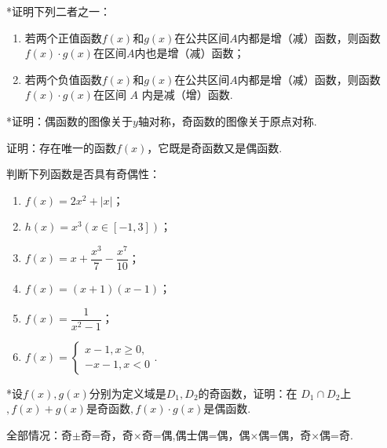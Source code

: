\documentclass[lang=cn,math=cm,chinesefont=nofont,11pt,scheme=chinese,twocol]{elegantbook}
\begin{document}
\begin{exercise}
  *证明下列二者之一：
\end{exercise}

\begin{enumerate}
  \item 若两个正值函数$f(x)$和$g(x)$在公共区间$A$内都是增（减）函数，则函数$f(x)\cdot g(x)$在区间$A$内也是增（减）函数；
  \item 若两个负值函数$f(x)$和$g(x)$在公共区间$A$内都是增（减）函数，则函数$f(x)\cdot g(x)$在区间 $A$ 内是减（增）函数.
\end{enumerate}

\begin{exercise}
  *证明：偶函数的图像关于$y$轴对称，奇函数的图像关于原点对称.
\end{exercise}

\begin{spacing}{1.8}
  \begin{exercise}
    证明：存在唯一的函数$f(x)$，它既是奇函数又是偶函数.
  \end{exercise}

  \begin{exercise}
    判断下列函数是否具有奇偶性：
  \end{exercise}

  \begin{enumerate}
    \item $f(x)=2x^2+|x|$；
    \item $h(x)=x^3(x\in[-1,3])$；
    \item $f(x)=x+\dfrac{x^3}7-\dfrac{x^7}{10}$；
    \item $f(x)=(x+1)(x-1)$；
    \item $f(x)=\dfrac{1}{x^{2}-1}$；
    \item $f(x)=\begin{cases}x-1, x\geqslant0,\\-x-1, x<0\end{cases}$.
  \end{enumerate}
\end{spacing}

\begin{exercise}
  *设$f(x),g(x)$分别为定义域是$D_1,D_2$的奇函数，证明：在 $D_1\cap D_2$上$,f(x)+g(x)$是奇函数$,f(x)\cdot g(x)$是偶函数.
\end{exercise}

\begin{remark}
  全部情况：奇$\pm$奇=奇，奇$\times$奇=偶,偶士偶=偶，偶×偶=偶，奇×偶=奇.
\end{remark}
\end{document}
